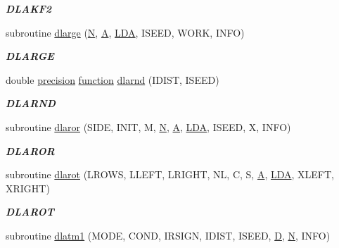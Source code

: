 \begin{DoxyCompactItemize}
\begin{DoxyCompactList}\small\item\em {\bfseries D\+L\+A\+K\+F2} \end{DoxyCompactList}\item 
subroutine \hyperlink{group__double__matgen_gac865b4946bb434dfd1da23af2cd640de}{dlarge} (\hyperlink{polmisc_8c_a0240ac851181b84ac374872dc5434ee4}{N}, \hyperlink{classA}{A}, \hyperlink{example__user_8c_ae946da542ce0db94dced19b2ecefd1aa}{L\+D\+A}, I\+S\+E\+E\+D, W\+O\+R\+K, I\+N\+F\+O)
\begin{DoxyCompactList}\small\item\em {\bfseries D\+L\+A\+R\+G\+E} \end{DoxyCompactList}\item 
double \hyperlink{numinquire_8h_a2c8e616467665d0b2814d4c1589ba74e}{precision} \hyperlink{afunc_8m_a7b5e596df91eadea6c537c0825e894a7}{function} \hyperlink{group__double__matgen_gabd395a0ee27baaacfda74ae5f068e42f}{dlarnd} (I\+D\+I\+S\+T, I\+S\+E\+E\+D)
\begin{DoxyCompactList}\small\item\em {\bfseries D\+L\+A\+R\+N\+D} \end{DoxyCompactList}\item 
subroutine \hyperlink{group__double__matgen_gaece3fc845d85b79c43255efa270116ec}{dlaror} (S\+I\+D\+E, I\+N\+I\+T, M, \hyperlink{polmisc_8c_a0240ac851181b84ac374872dc5434ee4}{N}, \hyperlink{classA}{A}, \hyperlink{example__user_8c_ae946da542ce0db94dced19b2ecefd1aa}{L\+D\+A}, I\+S\+E\+E\+D, X, I\+N\+F\+O)
\begin{DoxyCompactList}\small\item\em {\bfseries D\+L\+A\+R\+O\+R} \end{DoxyCompactList}\item 
subroutine \hyperlink{group__double__matgen_ga5396f5b65127d563e133c7f1a0b5b03d}{dlarot} (L\+R\+O\+W\+S, L\+L\+E\+F\+T, L\+R\+I\+G\+H\+T, N\+L, C, S, \hyperlink{classA}{A}, \hyperlink{example__user_8c_ae946da542ce0db94dced19b2ecefd1aa}{L\+D\+A}, X\+L\+E\+F\+T, X\+R\+I\+G\+H\+T)
\begin{DoxyCompactList}\small\item\em {\bfseries D\+L\+A\+R\+O\+T} \end{DoxyCompactList}\item 
subroutine \hyperlink{group__double__matgen_ga18fe52c0d18897085218b9ba92c01412}{dlatm1} (M\+O\+D\+E, C\+O\+N\+D, I\+R\+S\+I\+G\+N, I\+D\+I\+S\+T, I\+S\+E\+E\+D, \hyperlink{odrpack_8h_a7dae6ea403d00f3687f24a874e67d139}{D}, \hyperlink{polmisc_8c_a0240ac851181b84ac374872dc5434ee4}{N}, I\+N\+F\+O)

\end{DoxyCompactItemize}
